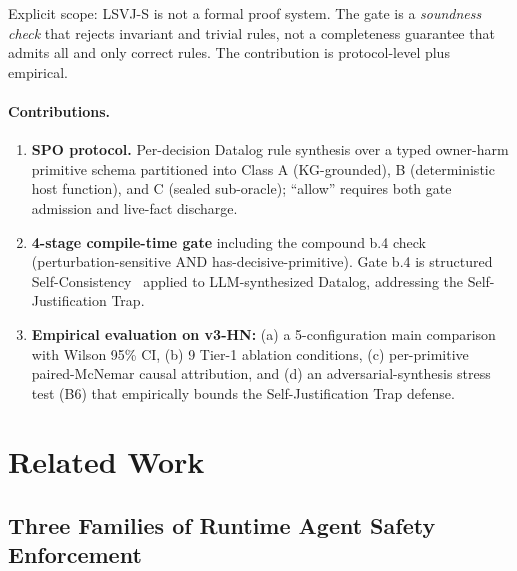 \documentclass{article}
\theoremstyle{definition}
\begin{document}
Explicit scope: LSVJ-S is not a formal proof system. The gate is a
\emph{soundness check} that rejects invariant and trivial rules, not a
completeness guarantee that admits all and only correct rules. The
contribution is protocol-level plus empirical.

\paragraph{Contributions.}
\begin{enumerate}[leftmargin=1.5em]
\item \textbf{SPO protocol.} Per-decision Datalog rule synthesis over
a typed owner-harm primitive schema partitioned into Class A
(KG-grounded), B (deterministic host function), and C (sealed
sub-oracle); ``allow'' requires both gate admission and live-fact
discharge.
\item \textbf{4-stage compile-time gate} including the compound b.4
check (perturbation-sensitive AND has-decisive-primitive). Gate b.4 is
structured Self-Consistency~\citep{wang2022selfconsistency} applied to
LLM-synthesized Datalog, addressing the Self-Justification Trap.
\item \textbf{Empirical evaluation on v3-HN:} (a) a 5-configuration
main comparison with Wilson 95\% CI, (b) 9 Tier-1 ablation conditions,
(c) per-primitive paired-McNemar causal attribution, and (d) an
adversarial-synthesis stress test (B6) that empirically bounds the
Self-Justification Trap defense.
\end{enumerate}

\section{Related Work}
\label{sec:related}

\subsection{Three Families of Runtime Agent Safety Enforcement}
\end{document}
